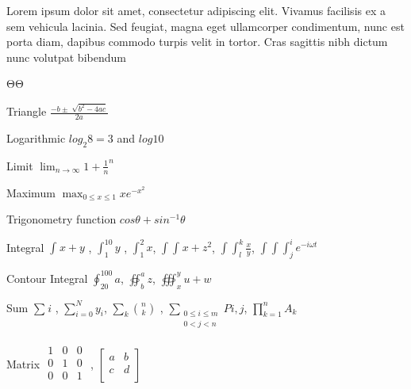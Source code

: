 \documentclass{book}
\begin{document}
Lorem ipsum dolor sit amet, consectetur adipiscing elit. Vivamus facilisis ex a sem vehicula lacinia. Sed feugiat, magna eget ullamcorper condimentum, nunc est porta diam, dapibus commodo turpis velit in tortor. Cras sagittis nibh dictum nunc volutpat bibendum 

ΘΘ

Triangle $\frac{-b\pm \sqrt[]{{b}^{2}-4ac}}{2a}$

Logarithmic ${log}_{2}8=3$ and $log10$

Limit $\lim_{n\rightarrow \infty }{1+\frac{1}{n}}^{n}$

Maximum $\max_{0\leq x\leq 1}x{e}^{-{x}^{2}}$

Trigonometry function $cos\theta + {sin}^{-1}\theta $

Integral $\int_{}^{} x+y$ , $\int_{1}^{10} y$ , $\int_{1}^{2} x$, $\int\!\int _{}^{} x+{z}^{2}$, $\int\!\int _{l}^{k} \frac{x}{y}$, $\int\!\int\!\int _{j}^{i} {e}^{-i\omega t}$

Contour Integral $\oint _{20}^{100} a$, $\oiint _{b}^{a} z$, $\oiiint _{x}^{y} u+w$

Sum $\sum _{}^{} i$ , $\sum _{i=0}^{N} {y}_{i}$, $\sum _{k}^{} {n \choose k}$ , $\sum _{\begin{array}{l}
0\leq  i \leq  m \\
0<j<n  \\
\end{array}}^{} Pi,j$, $\prod _{k=1}^{n} {A}_{k}$

Matrix $\begin{matrix}
 1 & 0 & 0 \\
0 & 1 & 0 \\
0 & 0 & 1 \\
 \end{matrix}
$ , $\begin{bmatrix}
 a & b \\
c & d \\
 \end{bmatrix}
$
\end{document}
